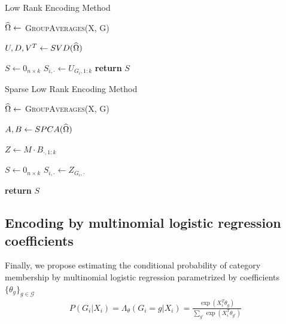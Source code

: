 \documentclass{article}
\theoremstyle{plain}
\theoremstyle{definition}
\theoremstyle{remark}
\begin{document}
\begin{algorithm}
\caption{Low Rank Encoding Method}\label{alg:lowrankmethod}
\begin{algorithmic}[1]

\State $\widehat{\Omega} \gets$ \textsc{GroupAverages}(X, G)

\State $U,D,V^T \gets SVD(\widehat{\Omega})$

\State $S \gets 0_{n \times k}$
  \State $S_{i,\cdot} \gets U_{G_{i},1:k}$
\EndFor
\State \textbf{return} $S$
\EndProcedure
\end{algorithmic}
\end{algorithm}


\begin{algorithm}
\caption{Sparse Low Rank Encoding Method}\label{alg:sparselowrankmethod}
\begin{algorithmic}[1]

\State $\widehat{\Omega} \gets$ \textsc{GroupAverages}(X, G)

\State $A, B \gets SPCA(\widehat{\Omega})$

\State $Z \gets M \cdot B_{\cdot,1:k}$

\State $S \gets 0_{n \times k}$
\State $S_{i,\cdot} \gets Z_{G_i,\cdot}$
\EndFor

\State \textbf{return} $S$
\EndProcedure
\end{algorithmic}
\end{algorithm}



\subsection{Encoding by multinomial logistic regression coefficients}
\label{subsec:mnl}

Finally, we propose estimating the conditional probability of category membership by multinomial logistic regression parametrized by coefficients $\{\theta_{g} \}_{g \in \mathcal{G}}$
\begin{align}
P(G_{i}|X_{i}) = \Lambda_{\theta}(G_{i}=g | X_{i}) =  \frac{\exp(X_{i}^{T} \theta_{g})}{\sum_{g'}\exp(X_{i}^{T}\theta_{g'})}
\label{eq:mnl}
\end{align}
\end{document}
